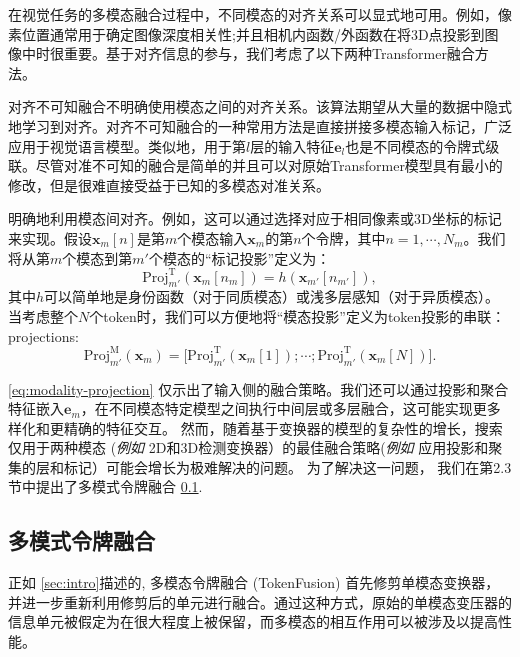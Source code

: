 在视觉任务的多模态融合过程中，不同模态的对齐关系可以显式地可用。例如，像素位置通常用于确定图像深度相关性;并且相机内函数/外函数在将3D点投影到图像中时很重要。基于对齐信息的参与，我们考虑了以下两种Transformer融合方法。

对齐不可知融合不明确使用模态之间的对齐关系。该算法期望从大量的数据中隐式地学习到对齐。对齐不可知融合的一种常用方法是直接拼接多模态输入标记，广泛应用于视觉语言模型。类似地，用于第$l$层的输入特征$\bm{e}_l$也是不同模态的令牌式级联。尽管对准不可知的融合是简单的并且可以对原始Transformer模型具有最小的修改，但是很难直接受益于已知的多模态对准关系。

\label{sec:对齐感知融合}明确地利用模态间对齐。例如，这可以通过选择对应于相同像素或3D坐标的标记来实现。假设$\bm{x}_m[n]$是第$m$个模态输入$\bm{x}_m$的第$n$个令牌，其中$n=1,\cdots,N_m$。我们将从第$m$个模态到第$m'$个模态的“标记投影”定义为：
\begin{equation}
	\label{eq:token-projection}
	\mathrm{Proj}^\text{T}_{m'}(\bm{x}_{m}[n_{m}])=h(\bm{x}_{m'}[n_{m'}]),
\end{equation}
其中$h$可以简单地是身份函数（对于同质模态）或浅多层感知（对于异质模态）。当考虑整个$N$个token时，我们可以方便地将“模态投影”定义为token投影的串联：
projections:\vskip-0.2in
\begin{equation}
	\label{eq:modality-projection}
	{\mathrm{Proj}}^\text{M}_{m'}(\bm{x}_{m})=\big[\mathrm{Proj}^\text{T}_{m'}(\bm{x}_{m}[1]); \cdots; \mathrm{Proj}^\text{T}_{m'}(\bm{x}_{m}[N])\big].
\end{equation}

\ref{eq:modality-projection} 仅示出了输入侧的融合策略。我们还可以通过投影和聚合特征嵌入$\bm{e}_m$，在不同模态特定模型之间执行中间层或多层融合，这可能实现更多样化和更精确的特征交互。
然而，随着基于变换器的模型的复杂性的增长，搜索仅用于两种模态 (\emph{例如} 2D和3D检测变换器）的最佳融合策略(\emph{例如} 应用投影和聚集的层和标记）可能会增长为极难解决的问题。 
为了解决这一问题， 我们在第2.3节中提出了多模式令牌融合 \ref{subsec:mix_transformers}.



\subsection{多模式令牌融合}
\label{subsec:mix_transformers}



正如 \ref{sec:intro}描述的, 多模态令牌融合 (TokenFusion) 首先修剪单模态变换器，并进一步重新利用修剪后的单元进行融合。通过这种方式，原始的单模态变压器的信息单元被假定为在很大程度上被保留，而多模态的相互作用可以被涉及以提高性能。

